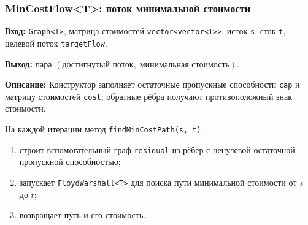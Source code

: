 \subsubsection{MinCostFlow\textless T\textgreater: поток минимальной стоимости}

\textbf{Вход:} \texttt{Graph<T>}, матрица стоимостей
\texttt{vector<vector<T>>}, исток \texttt{s}, сток \texttt{t},
целевой поток \texttt{targetFlow}.

\textbf{Выход:} пара $(\text{достигнутый поток},\; \text{минимальная стоимость})$.

\textbf{Описание:} Конструктор заполняет остаточные пропускные способности
\texttt{cap} и матрицу стоимостей \texttt{cost}; обратные рёбра получают
противоположный знак стоимости.

На каждой итерации метод \texttt{findMinCostPath(s, t)}:
\begin{enumerate}
    \item строит вспомогательный граф \texttt{residual} из рёбер
          с ненулевой остаточной пропускной способностью;
    \item запускает \texttt{FloydWarshall<T>} для поиска пути
          минимальной стоимости от $s$ до $t$;
    \item возвращает путь и его стоимость.
\end{enumerate}

